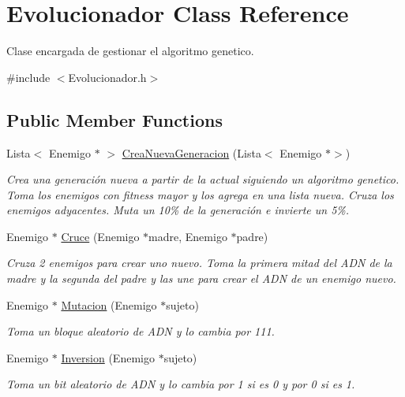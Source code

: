 \hypertarget{classEvolucionador}{}\section{Evolucionador Class Reference}
\label{classEvolucionador}


Clase encargada de gestionar el algoritmo genetico.  




{\ttfamily \#include $<$Evolucionador.\+h$>$}

\subsection*{Public Member Functions}
\begin{DoxyCompactItemize}
\item 
Lista$<$ Enemigo $\ast$ $>$ \hyperlink{classEvolucionador_a6fee16ccc7ee18b0be41709b10f4a374}{Crea\+Nueva\+Generacion} (Lista$<$ Enemigo $\ast$$>$)
\begin{DoxyCompactList}\small\item\em Crea una generación nueva a partir de la actual siguiendo un algoritmo genetico. Toma los enemigos con fitness mayor y los agrega en una lista nueva. Cruza los enemigos adyacentes. Muta un 10\% de la generación e invierte un 5\%. \end{DoxyCompactList}\item 
Enemigo $\ast$ \hyperlink{classEvolucionador_a7314c24ac7bd26a185ca15e9552e08a1}{Cruce} (Enemigo $\ast$madre, Enemigo $\ast$padre)
\begin{DoxyCompactList}\small\item\em Cruza 2 enemigos para crear uno nuevo. Toma la primera mitad del A\+DN de la madre y la segunda del padre y las une para crear el A\+DN de un enemigo nuevo. \end{DoxyCompactList}\item 
Enemigo $\ast$ \hyperlink{classEvolucionador_a75021ad99b4f7de2005e75b37c1b3514}{Mutacion} (Enemigo $\ast$sujeto)
\begin{DoxyCompactList}\small\item\em Toma un bloque aleatorio de A\+DN y lo cambia por 111. \end{DoxyCompactList}\item 
Enemigo $\ast$ \hyperlink{classEvolucionador_a8607ddfc5393279f196e3558f108a622}{Inversion} (Enemigo $\ast$sujeto)
\begin{DoxyCompactList}\small\item\em Toma un bit aleatorio de A\+DN y lo cambia por 1 si es 0 y por 0 si es 1. \end{DoxyCompactList}\item 
$$
\end{DoxyCompactItemize}
